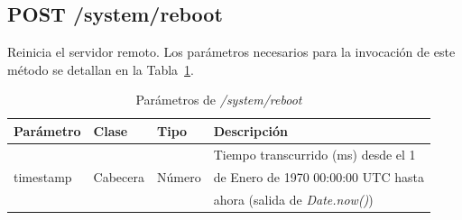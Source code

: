 %
%
\subsection{POST /system/reboot}

Reinicia el servidor remoto.
Los parámetros necesarios para la invocación de este método se detallan en la Tabla~\ref{extra:api:reboot:invocacion}.

\begin{table}[H]
\centering
\begin{tabular}{|l|l|l|l|}
\hline
\rowcolor[HTML]{F5F5F5}
\textbf{Parámetro}  & \textbf{Clase} & \textbf{Tipo} & \textbf{Descripción}                  \\ \hline
                    &                &               & Tiempo transcurrido (ms) desde el 1   \\
timestamp           & Cabecera       & Número        & de Enero de 1970 00:00:00 UTC hasta   \\
                    &                &               & ahora (salida de \textit{Date.now()}) \\ \hline
\end{tabular}
\caption{Parámetros de \textit{/system/reboot}}
\label{extra:api:reboot:invocacion}
\end{table}

